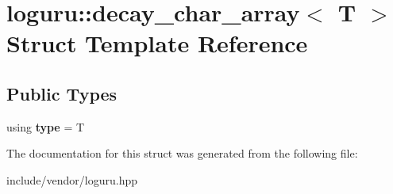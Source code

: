 \hypertarget{structloguru_1_1decay__char__array}{}\section{loguru\+:\+:decay\+\_\+char\+\_\+array$<$ T $>$ Struct Template Reference}
\label{structloguru_1_1decay__char__array}
\subsection*{Public Types}
\begin{DoxyCompactItemize}
\item 
\mbox{\label{structloguru_1_1decay__char__array_a5f699845478f888d5fcbc9142125d732}} 
using {\bfseries type} = T
\end{DoxyCompactItemize}


The documentation for this struct was generated from the following file\+:\begin{DoxyCompactItemize}
\item 
include/vendor/loguru.\+hpp\end{DoxyCompactItemize}
